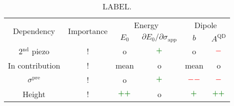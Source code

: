 \begin{table*}[!ht]
	\begin{center}
		\caption{LABEL. \label{tab:conclusion_straintuned} 
		}
		\begin{tabular}{cc|cc|cc}
			\hline \hline
			\multirow{2}{*}{Dependency} & \multirow{2}{*}{Importance} & \multicolumn{2}{c|}{Energy} & \multicolumn{2}{c}{Dipole}\\ \cline{3-6}
			 & &  $E_0$ & $\partial E_0/\partial\sigma_\mathrm{app}$  & $b$ & $A^{\mathrm{QD}}$\\  \hline
			 2$^\mathrm{nd}$ piezo& !&  o & $\textcolor{ps_green}{\boldsymbol{+}}$  & o&$\textcolor{red}{\boldsymbol{-}}$\\ \hline
			  In contribution& ! &  mean & o  & mean &o\\ \hline
			 $\sigma^\mathrm{pre}$& ! &  o &  $\textcolor{ps_green}{\boldsymbol{+}}$  & $\textcolor{red}{\boldsymbol{--}}$ &$\textcolor{red}{\boldsymbol{-}}$\\ \hline
			 Height& ! & $\textcolor{ps_green}{\boldsymbol{++}}$&  o  & $\textcolor{ps_green}{\boldsymbol{+}}$ &$\textcolor{ps_green}{\boldsymbol{++}}$\\ \hline
			\hline \hline
		\end{tabular}
	\end{center}
\end{table*}


